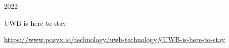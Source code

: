 \begin{thebibliography}{99}



    \bibitem[Pozyx]{}
    2022
    
    \newblock UWB is here to stay
    
    \url{https://www.pozyx.io/technology/uwb-technology#UWB-is-here-to-stay} 
    
    
    
    
    
    
    
    
    
    
    
    \end{thebibliography}
    